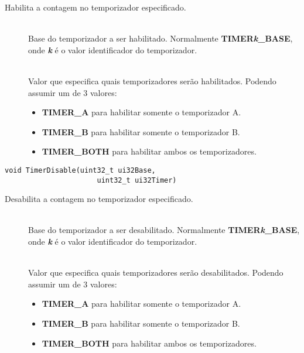 Habilita a contagem no temporizador especificado.

\begin{description}
	\item []\hfill \\
	Base do temporizador a ser habilitado. Normalmente \textbf{TIMER\emph{k}\_BASE}, onde \textbf{\emph{k}} é o valor identificador do temporizador.
	
	\item []\hfill \\
	Valor que especifica quais temporizadores serão habilitados. Podendo assumir um de 3 valores:
	\begin{itemize}
		\item \textbf{TIMER\_A} para habilitar somente o temporizador A.
		\item \textbf{TIMER\_B} para habilitar somente o temporizador B.
		\item \textbf{TIMER\_BOTH} para habilitar ambos os temporizadores.
	\end{itemize}
\end{description}

\begin{lstlisting}[style=funcao]
	void TimerDisable(uint32_t ui32Base,
					  uint32_t ui32Timer)
\end{lstlisting}

Desabilita a contagem no temporizador especificado.

\begin{description}
	\item []\hfill \\
	Base do temporizador a ser desabilitado. Normalmente \textbf{TIMER\emph{k}\_BASE}, onde \textbf{\emph{k}} é o valor identificador do temporizador.
	
	\item []\hfill \\
	Valor que especifica quais temporizadores serão desabilitados. Podendo assumir um de 3 valores:
	\begin{itemize}
		\item \textbf{TIMER\_A} para habilitar somente o temporizador A.
		\item \textbf{TIMER\_B} para habilitar somente o temporizador B.
		\item \textbf{TIMER\_BOTH} para habilitar ambos os temporizadores.
	\end{itemize}
\end{description}

